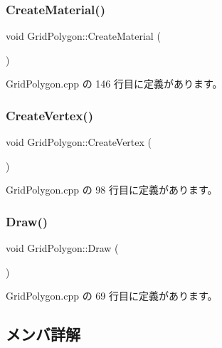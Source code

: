\subsubsection{\texorpdfstring{Create\+Material()}{CreateMaterial()}}
{\footnotesize\ttfamily void Grid\+Polygon\+::\+Create\+Material (\begin{DoxyParamCaption}{ }\end{DoxyParamCaption})\hspace{0.3cm}{\ttfamily [private]}}



 Grid\+Polygon.\+cpp の 146 行目に定義があります。

\mbox{\label{class_grid_polygon_a07b1e9c012d36086569860a30deb85d5}} 
\subsubsection{\texorpdfstring{Create\+Vertex()}{CreateVertex()}}
{\footnotesize\ttfamily void Grid\+Polygon\+::\+Create\+Vertex (\begin{DoxyParamCaption}{ }\end{DoxyParamCaption})\hspace{0.3cm}{\ttfamily [private]}}



 Grid\+Polygon.\+cpp の 98 行目に定義があります。

\mbox{\label{class_grid_polygon_a93a672fb9d5b6757c132fba8792f5459}} 
\subsubsection{\texorpdfstring{Draw()}{Draw()}}
{\footnotesize\ttfamily void Grid\+Polygon\+::\+Draw (\begin{DoxyParamCaption}{ }\end{DoxyParamCaption})}



 Grid\+Polygon.\+cpp の 69 行目に定義があります。



\subsection{メンバ詳解}
\mbox{\label{class_grid_polygon_a23d509ae7ad001e003897527380a8ca8}} 
